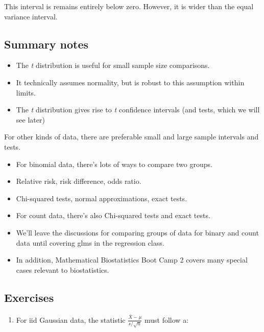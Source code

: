 \documentclass[]{article}
\begin{document}
This interval is remains entirely below zero. However, it is wider than
the equal variance interval.

\subsection{Summary notes}\label{summary-notes-6}

\begin{itemize}
\itemsep1pt\parskip0pt
\item
  The \emph{t} distribution is useful for small sample size comparisons.
\item
  It technically assumes normality, but is robust to this assumption
  within limits.
\item
  The \emph{t} distribution gives rise to \emph{t} confidence intervals
  (and tests, which we will see later)
\end{itemize}

For other kinds of data, there are preferable small and large sample
intervals and tests.

\begin{itemize}
\itemsep1pt\parskip0pt
\item
  For binomial data, there's lots of ways to compare two groups.
\item
  Relative risk, risk difference, odds ratio.
\item
  Chi-squared tests, normal approximations, exact tests.
\item
  For count data, there's also Chi-squared tests and exact tests.
\item
  We'll leave the discussions for comparing groups of data for binary
  and count data until covering glms in the regression class.
\item
  In addition, Mathematical Biostatistics Boot Camp 2 covers many
  special cases relevant to biostatistics.
\end{itemize}

\subsection{Exercises}\label{exercises-7}

\begin{enumerate}
\def\labelenumi{\arabic{enumi}.}
\itemsep1pt\parskip0pt
\item
  For iid Gaussian data, the statistic
  $\frac{\bar X - \mu}{s / \sqrt{n}}$ must follow a:
\end{enumerate}
\end{document}
